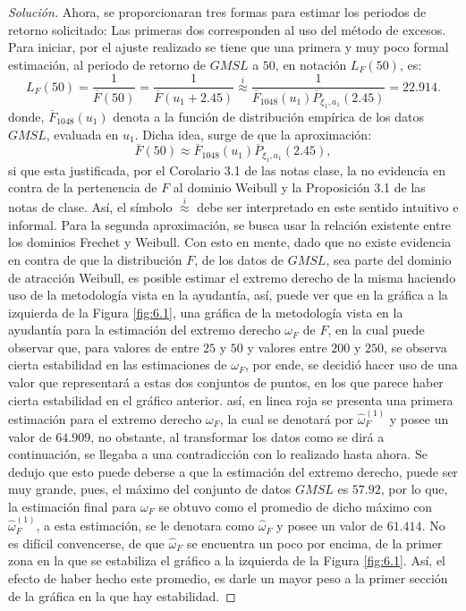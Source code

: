 \documentclass[10.5pt,notitlepage]{article}
\newenvironment{solucion}
  {\begin{proof}[Solución]}
  {\end{proof}}
\newcommand{\approxi}{\overset{i}{\approx}}
\theoremstyle{plain}
\begin{document}
\begin{solucion}
Ahora, se proporcionaran tres formas para estimar los periodos de retorno solicitado: Las primeras dos corresponden al uso del método de excesos. Para iniciar, por el ajuste realizado se tiene que una primera y muy poco formal estimación, al periodo de retorno de \(GMSL\) a \(50\), en notación \(L_{F}(50)\), es: 
\begin{equation}\label{lab.app1}
L_{F}(50) = \frac{1}{\overline{F}(50)} = \frac{1}{\overline{F}(u_1 + 2.45)} \overset{i}{\approx}   \frac{1}{\overline{F}_{1048}(u_1)\overline{P}_{ \xi_1,a_1}(2.45)} = 22.914.     
\end{equation}
donde, \(\overline{F}_{1048}(u_1)\) denota a la función de distribución empírica de los datos \(GMSL\), evaluada en \(u_1\). Dicha idea, surge de que la aproximación:
\[
\overline{F}(50) \approx \overline{F}_{1048}(u_1)\overline{P}_{\xi_1,a_1}(2.45),
\]
si que esta justificada, por el Corolario 3.1 de las notas clase, la no evidencia en contra de la pertenencia de \(F\) al dominio Weibull y la Proposición 3.1 de las notas de clase. Así, el símbolo \(\approxi\) debe ser interpretado en este sentido intuitivo e informal. Para la segunda aproximación, se busca usar la relación existente entre los dominios Frechet y Weibull. Con esto en mente, dado que no existe evidencia en contra de que la distribución \(F\), de los datos de \(GMSL\), sea parte del dominio de atracción Weibull, es posible estimar el extremo derecho de la misma haciendo uso de la metodología vista en la ayudantía, así, puede ver que en la gráfica a la izquierda de la Figura \ref{fig:6.1}, una gráfica de la metodología vista en la ayudantía para la estimación del extremo derecho \(\omega_F\) de \(F\), en la cual puede observar que, para valores de entre \(25\) y \(50\) y valores entre \(200\) y \(250\), se observa cierta estabilidad en las estimaciones de \(\omega_F\), por ende, se decidió hacer uso de una valor que representará a estas dos conjuntos de puntos, en los que parece haber cierta estabilidad en el gráfico anterior. así, en linea roja se presenta una primera estimación para el extremo derecho \(\omega_{F}\), la cual se denotará por \(\hat{\omega}_{F}^{(1)}\) y posee un valor de \(64.909\), no obstante, al transformar los datos como se dirá a continuación, se llegaba a una contradicción con lo realizado hasta ahora. Se dedujo que esto puede deberse a que la estimación del extremo derecho, puede ser muy grande, pues, el máximo del conjunto de datos \(GMSL\) es \(57.92\), por lo que, la estimación final para \(\omega_{F}\) se obtuvo como el promedio de dicho máximo con \(\hat{\omega}_{F}^{(1)}\), a esta estimación, se le denotara como \(\hat{\omega}_{F}\) y posee un valor de \(61.414\). No es difícil convencerse, de que \(\hat{\omega}_{F}\) se encuentra un poco por encima, de la primer zona en la que se estabiliza el gráfico a la izquierda de la Figura \ref{fig:6.1}. Así, el efecto de haber hecho este promedio, es darle un mayor peso a la primer sección de la gráfica en la que hay estabilidad. 


\end{solucion}
\end{document}
